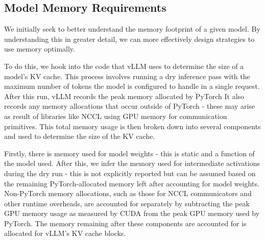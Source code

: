 \documentclass[12pt,twoside]{report}
\begin{document}
\subsection{Model Memory Requirements}
\begin{comment}
  - Need to understand memory breakdown in order to better understand how it is allocated/what can be moved around
  - do this by hooking into vLLM's memory allocation code
    - explain how this works
      - runs a dry run with maximum number of tokens
      - sees peak allocated memory by torch, as well as non-torch allocated memory
      - breaks this down into model weights, activations (we assume), non-torch allocated memory (nccl communicators etc. )
      - the rest is allocated as kv cache memory
    - Speak about how number of available gpu blocks available is affected by number of kv heads per layers and the number of total layers
  - as we can see, varying the utilisation parameter only changes the amount of memory allocated for the kv cache 
\end{comment}
We initially seek to better understand the memory footprint of a given model.
By understanding this in greater detail, we can more effectively design strategies to use memory optimally.

To do this, we hook into the code that vLLM uses to determine the size of a model's KV cache.
This process involves running a dry inference pass with the maximum number of tokens the model is configured to handle in a single request.
After this run, vLLM records the peak memory allocated by PyTorch
It also records any memory allocations that occur outside of PyTorch - these may arise as result of libraries like NCCL using GPU memory for communication primitives.
This total memory usage is then broken down into several components and used to determine the size of the KV cache.

Firstly, there is memory used for model weights - this is static and a function of the model used.
After this, we infer the memory used for intermediate activations during the dry run - this is not explicitly reported but can be assumed based on the remaining PyTorch-allocated memory left after accounting for model weights.
Non-PyTorch memory allocations, such as those for NCCL communicators and other runtime overheads, are accounted for separately by subtracting the peak GPU memory usage as measured by CUDA from the peak GPU memory used by PyTorch.
The memory remaining after these components are accounted for is allocated for vLLM's KV cache blocks.
\end{document}
